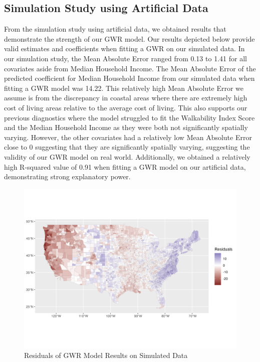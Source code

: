 \documentclass[
]{article}
\begin{document}
\subsection{Simulation Study using Artificial
Data}\label{simulation-study-using-artificial-data}

From the simulation study using artificial data, we obtained results
that demonstrate the strength of our GWR model. Our results depicted
below provide valid estimates and coefficients when fitting a GWR on our
simulated data. In our simulation study, the Mean Absolute Error ranged
from 0.13 to 1.41 for all covariates aside from Median Household Income.
The Mean Absolute Error of the predicted coefficient for Median
Household Income from our simulated data when fitting a GWR model was
14.22. This relatively high Mean Absolute Error we assume is from the
discrepancy in coastal areas where there are extremely high cost of
living areas relative to the average cost of living. This also supports
our previous diagnostics where the model struggled to fit the
Walkability Index Score and the Median Household Income as they were
both not significantly spatially varying. However, the other covariates
had a relatively low Mean Absolute Error close to 0 suggesting that they
are significantly spatially varying, suggesting the validity of our GWR
model on real world. Additionally, we obtained a relatively high
R-squared value of 0.91 when fitting a GWR model on our artificial data,
demonstrating strong explanatory power.

\begin{figure}[H]

{\centering \includegraphics{sim_residual_plot.png}

}

\caption{Residuals of GWR Model Results on Simulated Data}

\end{figure}%
\end{document}
